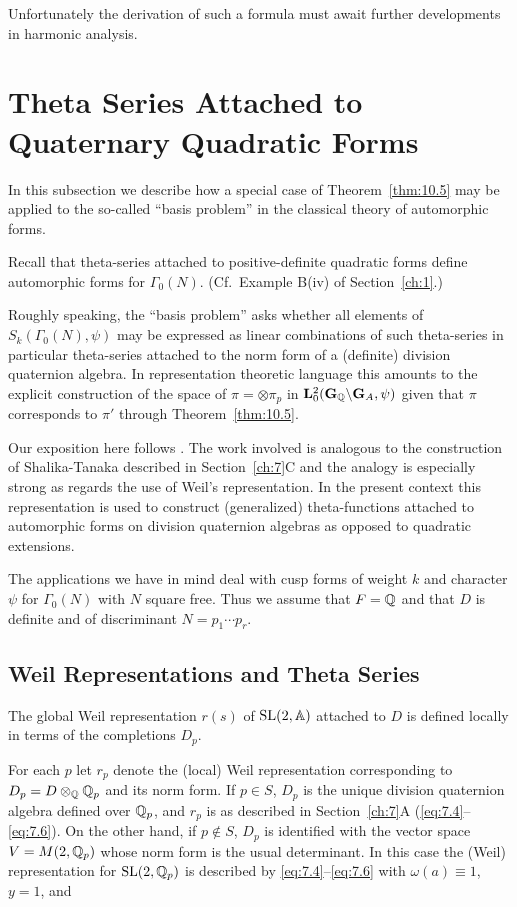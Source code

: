 Unfortunately the derivation of such a formula must await further developments in harmonic analysis.

\section{Theta Series Attached to Quaternary Quadratic Forms}\label{sec:10d}

In this subsection we describe how a special case of Theorem~\ref{thm:10.5} may be applied to the so-called ``basis problem'' in the classical theory of automorphic forms.

Recall that theta-series attached to positive-definite quadratic forms define automorphic forms for $\Gamma_0(N)$. (Cf.\ Example B(iv) of Section~\ref{ch:1}.)

Roughly speaking, the ``basis problem'' asks whether all elements of $S_k(\Gamma_0(N), \psi)$ may be expressed as linear combinations of such theta-series in particular theta-series attached to the norm form of a (definite) division quaternion algebra. In representation theoretic language this amounts to the explicit construction of the space of $\pi = \otimes \pi_p$ in $\mathbf{L}_0^2(\mathbf{G}_{\mathbb{Q}} \backslash \mathbf{G}_A, \psi)$ given that $\pi$ corresponds to $\pi'$ through Theorem~\ref{thm:10.5}.

Our exposition here follows \cite{Shimizu}. The work involved is analogous to the construction of Shalika-Tanaka described in Section~\ref{ch:7}C and the analogy is especially strong as regards the use of Weil's representation. In the present context this representation is used to construct (generalized) theta-functions attached to automorphic forms on division quaternion algebras as opposed to quadratic extensions.

The applications we have in mind deal with cusp forms of weight $k$ and character $\psi$ for $\Gamma_0(N)$ with $N$ square free. Thus we assume that $F = \mathbb{Q}$ and that $D$ is definite and of discriminant $N = p_1 \cdots p_r$.

\subsection{Weil Representations and Theta Series}

The global Weil representation $r(s)$ of $\operatorname{SL}(2, \mathbb{A})$ attached to $D$ is defined locally in terms of the completions $D_p$.

For each $p$ let $r_p$ denote the (local) Weil representation corresponding to $D_p = D \otimes_{\mathbb{Q}} \mathbb{Q}_p$ and its norm form. If $p \in S$, $D_p$ is the unique division quaternion algebra defined over $\mathbb{Q}_p$, and $r_p$ is as described in Section~\ref{ch:7}A (\eqref{eq:7.4}--\eqref{eq:7.6}). On the other hand, if $p \notin S$, $D_p$ is identified with the vector space $V = M(2, \mathbb{Q}_p)$ whose norm form is the usual determinant. In this case the (Weil) representation for $\operatorname{SL}(2, \mathbb{Q}_p)$ is described by \eqref{eq:7.4}--\eqref{eq:7.6} with $\omega(a) \equiv 1$, $y = 1$, and

